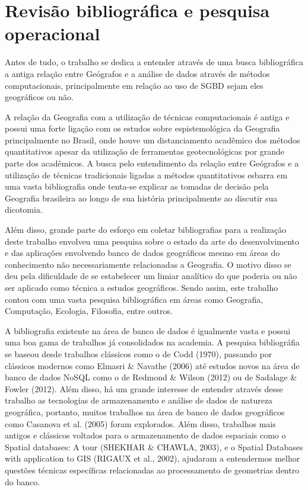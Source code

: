 \chapter{Revisão bibliográfica e pesquisa operacional}
Antes de tudo, o trabalho se dedica a entender através de uma busca bibliográfica a antiga relação entre Geógrafos e a análise de dados através de métodos computacionais, principalmente em relação ao uso de SGBD sejam eles geográficos ou não. 

A relação da Geografia com a utilização de técnicas computacionais é antiga e possui uma forte ligação com os estudos sobre espistemológica da Geografia principalmente no Brasil, onde houve um distanciamento acadêmico dos métodos quantitativos apesar da utilização de ferramentas geotecnológicas por grande parte dos acadêmicos. A busca pelo entendimento da relação entre Geógrafos e a utilização de técnicas tradicionais ligadas a métodos quantitativos esbarra em uma vasta bibliografia onde tenta-se explicar as tomadas de decisão pela Geografia brasileira ao longo de sua história principalmente ao discutir sua dicotomia. 

Além disso, grande parte do esforço em coletar bibliografias para a realização deste trabalho envolveu uma pesquisa sobre o estado da arte do desenvolvimento e das aplicações envolvendo banco de dados geográficos mesmo em áreas do conhecimento não necessariamente relacionadas a Geografia. O motivo disso se deu pela dificuldade de se estabelecer um limiar analítico do que poderia ou não ser aplicado como técnica a estudos geográficos. Sendo assim, este trabalho contou com uma vasta pesquisa bibliográfica em áreas como Geografia, Computação, Ecologia, Filosofia, entre outros. 

A bibliografia existente na área de banco de dados é igualmente vasta e possui uma boa gama de trabalhos já consolidados na academia. A pesquisa bibliográfia se baseou desde trabalhos clássicos como o de Codd (1970), passando por clássicos modernos como Elmasri \& Navathe (2006) até estudos novos na área de banco de dados NoSQL como o de Redmond \& Wilson (2012) ou de Sadalage \& Fowler (2012). Além disso, há um grande interesse de entender através desse trabalho as tecnologias de armazenamento e análise de dados de natureza geográfica, portanto, muitos trabalhos na área de banco de dados geográficos como Casanova et al. (2005) foram explorados. Além disso, trabalhos mais antigos e clássicos voltados para o armazenamento de dados espaciais como o Spatial databases: A tour (SHEKHAR \& CHAWLA, 2003), e o Spatial Databases with application to GIS (RIGAUX et al., 2002), ajudaram a entendermos melhor questões técnicas específicas relacionadas ao processamento de geometrias dentro do banco.

